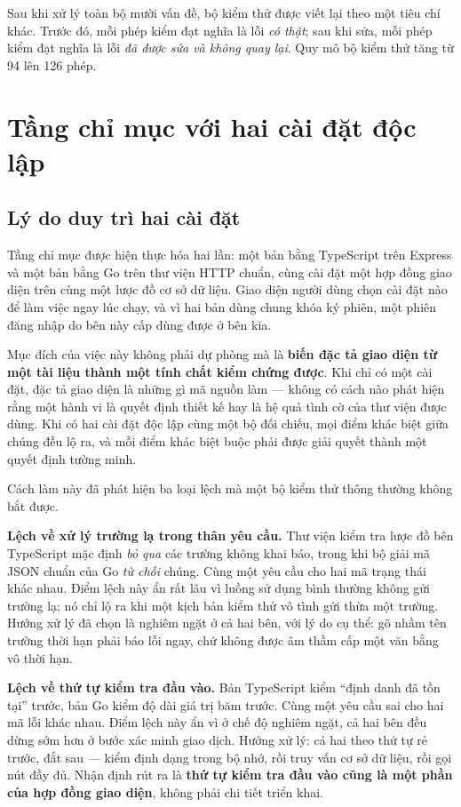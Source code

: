Sau khi xử lý toàn bộ mười vấn đề, bộ kiểm thử được viết lại theo một tiêu chí khác. Trước đó, mỗi phép kiểm đạt nghĩa là lỗi \emph{có thật}; sau khi sửa, mỗi phép kiểm đạt nghĩa là lỗi \emph{đã được sửa và không quay lại}. Quy mô bộ kiểm thử tăng từ 94 lên 126 phép.

\section{Tầng chỉ mục với hai cài đặt độc lập}

\subsection{Lý do duy trì hai cài đặt}

Tầng chỉ mục được hiện thực hóa hai lần: một bản bằng TypeScript trên Express và một bản bằng Go trên thư viện HTTP chuẩn, cùng cài đặt một hợp đồng giao diện trên cùng một lược đồ cơ sở dữ liệu. Giao diện người dùng chọn cài đặt nào để làm việc ngay lúc chạy, và vì hai bản dùng chung khóa ký phiên, một phiên đăng nhập do bên này cấp dùng được ở bên kia.

Mục đích của việc này không phải dự phòng mà là \textbf{biến đặc tả giao diện từ một tài liệu thành một tính chất kiểm chứng được}. Khi chỉ có một cài đặt, đặc tả giao diện là những gì mã nguồn làm --- không có cách nào phát hiện rằng một hành vi là quyết định thiết kế hay là hệ quả tình cờ của thư viện được dùng. Khi có hai cài đặt độc lập cùng một bộ đối chiếu, mọi điểm khác biệt giữa chúng đều lộ ra, và mỗi điểm khác biệt buộc phải được giải quyết thành một quyết định tường minh.

Cách làm này đã phát hiện ba loại lệch mà một bộ kiểm thử thông thường không bắt được.

\textbf{Lệch về xử lý trường lạ trong thân yêu cầu.} Thư viện kiểm tra lược đồ bên TypeScript mặc định \emph{bỏ qua} các trường không khai báo, trong khi bộ giải mã JSON chuẩn của Go \emph{từ chối} chúng. Cùng một yêu cầu cho hai mã trạng thái khác nhau. Điểm lệch này ẩn rất lâu vì luồng sử dụng bình thường không gửi trường lạ; nó chỉ lộ ra khi một kịch bản kiểm thử vô tình gửi thừa một trường. Hướng xử lý đã chọn là nghiêm ngặt ở cả hai bên, với lý do cụ thể: gõ nhầm tên trường thời hạn phải báo lỗi ngay, chứ không được âm thầm cấp một văn bằng vô thời hạn.

\textbf{Lệch về thứ tự kiểm tra đầu vào.} Bản TypeScript kiểm {``}định danh đã tồn tại{''} trước, bản Go kiểm độ dài giá trị băm trước. Cùng một yêu cầu sai cho hai mã lỗi khác nhau. Điểm lệch này ẩn vì ở chế độ nghiêm ngặt, cả hai bên đều dừng sớm hơn ở bước xác minh giao dịch. Hướng xử lý: cả hai theo thứ tự rẻ trước, đắt sau --- kiểm định dạng trong bộ nhớ, rồi truy vấn cơ sở dữ liệu, rồi gọi nút đầy đủ. Nhận định rút ra là \textbf{thứ tự kiểm tra đầu vào cũng là một phần của hợp đồng giao diện}, không phải chi tiết triển khai.

